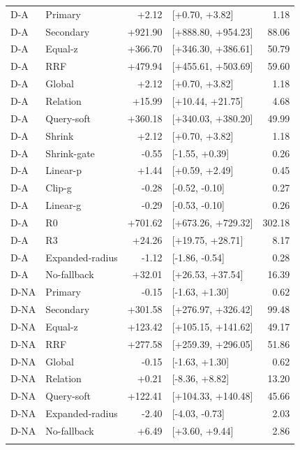 \begin{table}[htbp]
\begin{tabular}{llrlr}
D-A & Primary & +2.12 & [+0.70, +3.82] & 1.18\\
D-A & Secondary & +921.90 & [+888.80, +954.23] & 88.06\\
D-A & Equal-z & +366.70 & [+346.30, +386.61] & 50.79\\
D-A & RRF & +479.94 & [+455.61, +503.69] & 59.60\\
D-A & Global & +2.12 & [+0.70, +3.82] & 1.18\\
D-A & Relation & +15.99 & [+10.44, +21.75] & 4.68\\
D-A & Query-soft & +360.18 & [+340.03, +380.20] & 49.99\\
D-A & Shrink & +2.12 & [+0.70, +3.82] & 1.18\\
D-A & Shrink-gate & -0.55 & [-1.55, +0.39] & 0.26\\
D-A & Linear-p & +1.44 & [+0.59, +2.49] & 0.45\\
D-A & Clip-g & -0.28 & [-0.52, -0.10] & 0.27\\
D-A & Linear-g & -0.29 & [-0.53, -0.10] & 0.26\\
D-A & R0 & +701.62 & [+673.26, +729.32] & 302.18\\
D-A & R3 & +24.26 & [+19.75, +28.71] & 8.17\\
D-A & Expanded-radius & -1.12 & [-1.86, -0.54] & 0.28\\
D-A & No-fallback & +32.01 & [+26.53, +37.54] & 16.39\\
\addlinespace
D-NA & Primary & -0.15 & [-1.63, +1.30] & 0.62\\
D-NA & Secondary & +301.58 & [+276.97, +326.42] & 99.48\\
D-NA & Equal-z & +123.42 & [+105.15, +141.62] & 49.17\\
D-NA & RRF & +277.58 & [+259.39, +296.05] & 51.86\\
D-NA & Global & -0.15 & [-1.63, +1.30] & 0.62\\
D-NA & Relation & +0.21 & [-8.36, +8.82] & 13.20\\
D-NA & Query-soft & +122.41 & [+104.33, +140.48] & 45.66\\
D-NA & Expanded-radius & -2.40 & [-4.03, -0.73] & 2.03\\
D-NA & No-fallback & +6.49 & [+3.60, +9.44] & 2.86\\
\addlinespace
\bottomrule
\end{tabular}
\end{table}
